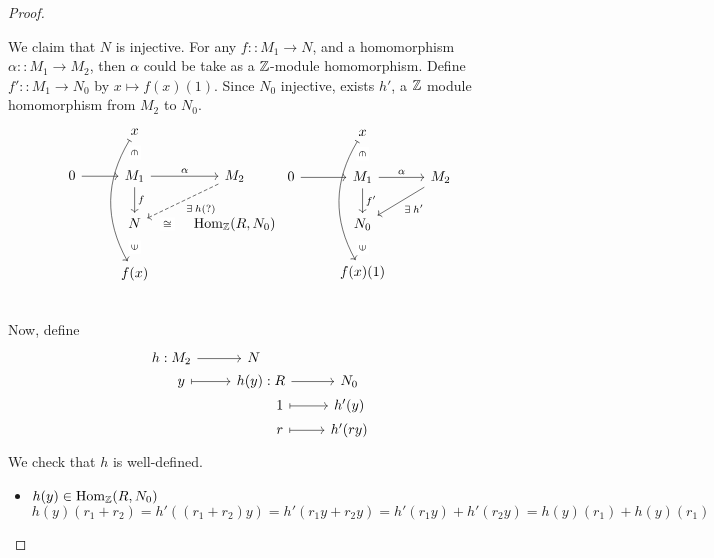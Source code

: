 \begin{theorem}
\begin{proof}
\begin{enumerate}[label={\bf Case \arabic*:}]
        We claim that $N$ is injective. For any $f :: M_1 \to N$,
        and a homomorphism $\alpha :: M_1 \to M_2$,
        then $\alpha$ could be take as a $\mathbb{Z}$-module homomorphism.
        Define $f' :: M_1 \to N_0$ by $x \mapsto f(x)(1)$. Since
        $N_0$ injective, exists $h'$, a $\mathbb{Z}$ module
        homomorphism from $M_2$ to $N_0$.
        \[
          \begin{tikzcd}[contains/.style = {draw=none, 
            "\in" description ,sloped}]
                        & x \ar[d, contains] \ar[ddd, mapsto, bend right] \\
              0 \ar[r]  & M_1 \ar[r,"\alpha"] \ar[d, "f"] & M_2 \ar[ld, 
              "\exists h (?)",dashed] \\
                        & N \ar[r, draw=none, "\cong" description]&  
                        \Hom_\Zb(R, N_0) \\
                        & f(x) \ar[u, contains] \\
            \end{tikzcd}
            \begin{tikzcd}[contains/.style = {draw=none, 
            "\in" description ,sloped}]
                        & x \ar[d, contains] \ar[ddd, mapsto, bend right] \\
              0 \ar[r]  & M_1 \ar[r,"\alpha"] \ar[d, "f'"] & M_2 \ar[ld, 
              "\exists h'"] \\
                        & N_0 \\
                        & f(x)(1) \ar[u, contains] \\
          \end{tikzcd}
        \]
        Now, define
        \[
        \begin{tikzcd}[row sep=0.1]
          h: &[-3em] M_2 \ar[r] & N \\
             &[-3em] y \ar[r, mapsto] & h(y) : &[-3em] R \ar[r] & N_0 \\
             &[-3em] & &[-3em] 1 \ar[r, mapsto] & h'(y) \\
             &[-3em] & &[-3em] r \ar[r, mapsto] & h'(ry) \\
        \end{tikzcd}
        \]
        We check that $h$ is well-defined.
        \begin{itemize}
          \item $h(y) \in \operatorname{Hom}_{\mathbb{Z}}(R, N_0)$
            \[
              h(y)(r_1 + r_2) = h'((r_1 + r_2)y) = h'(r_1 y + r_2 y)
              = h'(r_1y) + h'(r_2y) = h(y)(r_1) + h(y)(r_1)
\]
\end{itemize}
\end{enumerate}
\end{proof}
\end{theorem}
